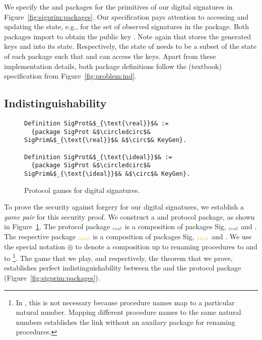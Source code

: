 %
We specify the \real and \ideal packages for the primitives
of our digital signatures in Figure~\ref{fig:sigprim:packages}.
%
Our specification pays attention to accessing and updating
the state, e.g., for the set  of observed signatures in the
\ideal package.
%
Both packages import \ekeygen to obtain the
public key .
%
Note again that \ekeygen stores the generated keys 
and  into its state.
%
Respectively, the state of \pkeygen needs to be a
subset of the state of each package such that \esign and
\eversig can access the keys.
%
Apart from these implementation details,
both package definitions follow the (textbook)
specification from Figure~\ref{fig:problem:ind}.
%


\subsection{Indistinguishability}

\begin{figure}
    \begin{verbatim}
Definition SigProt&$_{\text{\real}}$& :=
  {package SigProt &$\circledcirc$& SigPrim&$_{\text{\real}}$& &$\circ$& KeyGen}.

Definition SigProt&$_{\text{\ideal}}$& :=
  {package SigProt &$\circledcirc$& SigPrim&$_{\text{\ideal}}$& &$\circ$& KeyGen}.
    \end{verbatim}
   \caption{Protocol games for digital signatures.}
   \label{fig:sigprot}
\end{figure}

%
To prove the security against forgery for our digital signatures, 
we establish a \emph{game pair} for this security proof. 
%
We construct a \real and \ideal protocol package, as shown in Figure~\ref{fig:sigprot}. 
%
The \real protocol package
\psigprot$_{\text{\real}}$ is a composition of packages
Sig\prot, \psigprim$_{\text{\real}}$ and \pkeygen. 
%
The respective \ideal package
\psigprot$_{\text{\ideal}}$ is a composition of packages
Sig\prot, \psigprim$_{\text{\ideal}}$ and \pkeygen.
%
We use the special notation $\circledcirc$ to denote a composition
up to renaming procedures \esign to  and
\eversig to %
\footnote{
%
In \ssprove , this is not necessary because procedure names map
to a particular natural number.
%
Mapping different procedure names to the same natural numbers
establishes the link without an auxilary package for renaming
procedures.
%
}.
%
The game that we play, and respectively, the theorem that we prove,
establishes perfect indistinguishability between the \real and 
the \ideal protocol package (Figure~\ref{fig:sigprim:packages}).

